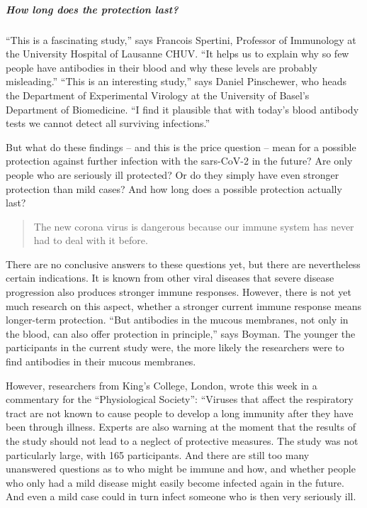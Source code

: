 \hypertarget{how-long-does-the-protection-last}{%
\subparagraph{\texorpdfstring{\textbf{How long does the protection
last?}}{How long does the protection last?}}\label{how-long-does-the-protection-last}}

``This is a fascinating study,'' says Francois Spertini, Professor of
Immunology at the University Hospital of Lausanne CHUV. ``It helps us to
explain why so few people have antibodies in their blood and why these
levels are probably misleading.'' ``This is an interesting study,'' says
Daniel Pinschewer, who heads the Department of Experimental Virology at
the University of Basel's Department of Biomedicine. ``I find it
plausible that with today's blood antibody tests we cannot detect all
surviving infections.''

But what do these findings -- and this is the price question -- mean for
a possible protection against further infection with the sars-CoV-2 in
the future? Are only people who are seriously ill protected? Or do they
simply have even stronger protection than mild cases? And how long does
a possible protection actually last?

\begin{quote}
The new corona virus is dangerous because our immune system has never
had to deal with it before.
\end{quote}

There are no conclusive answers to these questions yet, but there are
nevertheless certain indications. It is known from other viral diseases
that severe disease progression also produces stronger immune responses.
However, there is not yet much research on this aspect, whether a
stronger current immune response means longer-term protection. ``But
antibodies in the mucous membranes, not only in the blood, can also
offer protection in principle,'' says Boyman. The younger the
participants in the current study were, the more likely the researchers
were to find antibodies in their mucous membranes.

However, researchers from King's College, London, wrote this week in a
commentary for the ``Physiological Society'': ``Viruses that affect the
respiratory tract are not known to cause people to develop a long
immunity after they have been through illness. Experts are also warning
at the moment that the results of the study should not lead to a neglect
of protective measures. The study was not particularly large, with 165
participants. And there are still too many unanswered questions as to
who might be immune and how, and whether people who only had a mild
disease might easily become infected again in the future. And even a
mild case could in turn infect someone who is then very seriously ill.


